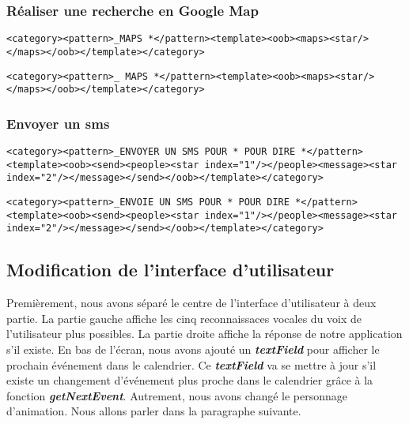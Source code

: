 \subsubsection{Réaliser une recherche en Google Map}
\begin{lstlisting}[frame=none,aboveskip=0.5em]
<category><pattern>_MAPS *</pattern><template><oob><maps><star/></maps></oob></template></category>
\end{lstlisting}

\begin{lstlisting}[frame=none,aboveskip=0.5em]
<category><pattern>_ MAPS *</pattern><template><oob><maps><star/></maps></oob></template></category>
\end{lstlisting}

\subsubsection{Envoyer un sms}
\begin{lstlisting}[frame=none,aboveskip=0.5em]
<category><pattern>_ENVOYER UN SMS POUR * POUR DIRE *</pattern><template><oob><send><people><star index="1"/></people><message><star index="2"/></message></send></oob></template></category>
\end{lstlisting}

\begin{lstlisting}[frame=none,aboveskip=0.5em,belowskip=1.5em]
<category><pattern>_ENVOIE UN SMS POUR * POUR DIRE *</pattern><template><oob><send><people><star index="1"/></people><message><star index="2"/></message></send></oob></template></category>
\end{lstlisting}



\subsection{Modification de l'interface d'utilisateur}
\indent Premièrement, nous avons séparé le centre de l'interface d'utilisateur à deux partie. La partie gauche affiche les cinq reconnaissaces vocales du voix de l'utilisateur plus possibles. La partie droite affiche la réponse de notre application s'il existe. En bas de l'écran, nous avons ajouté un \textbf{\emph{textField}} pour afficher le prochain événement dans le calendrier. Ce \textbf{\emph{textField}} va se mettre à jour s'il existe un changement d'événement plus proche dans le calendrier grâce à la fonction \textbf{\emph{getNextEvent}}. Autrement, nous avons changé le personnage d'animation. Nous allons parler dans la paragraphe suivante.

